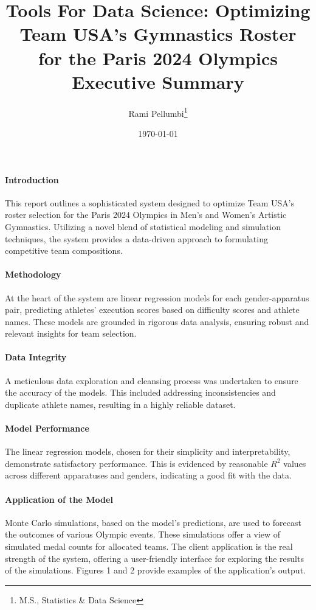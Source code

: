\documentclass{article}
\title{Tools For Data Science: Optimizing Team USA's Gymnastics Roster for the Paris 2024 Olympics \\ \textbf{Executive Summary}}
\author{Rami Pellumbi\thanks{M.S., Statistics \& Data Science}}
\date{\today}
\begin{document}
\maketitle
\newpage
\paragraph{Introduction} This report outlines a sophisticated system designed to optimize Team USA's roster selection for the Paris 2024 Olympics in Men's and Women's Artistic Gymnastics. Utilizing a novel blend of statistical modeling and simulation techniques, the system provides a data-driven approach to formulating competitive team compositions.

\paragraph{Methodology}
At the heart of the system are linear regression models for each gender-apparatus pair, predicting athletes' execution scores based on difficulty scores and athlete names. These models are grounded in rigorous data analysis, ensuring robust and relevant insights for team selection.

\paragraph{Data Integrity} A meticulous data exploration and cleansing process was undertaken to ensure the accuracy of the models. This included addressing inconsistencies and duplicate athlete names, resulting in a highly reliable dataset.

\paragraph{Model Performance} The linear regression models, chosen for their simplicity and interpretability, demonstrate satisfactory performance. This is evidenced by reasonable 
$R^2$ values across different apparatuses and genders, indicating a good fit with the data.

\paragraph{Application of the Model}
Monte Carlo simulations, based on the model's predictions, are used to forecast the outcomes of various Olympic events. 
These simulations offer a view of simulated medal counts for allocated teams. The 
client application is the real strength of the system, offering a user-friendly
interface for exploring the results of the simulations. Figures 1 and 2 provide
examples of the application's output.
\end{document}
